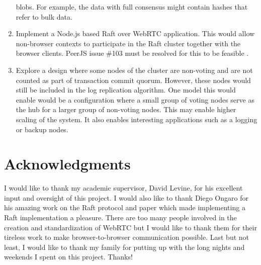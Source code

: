 \documentclass[conference,compsoc]{./IEEEtran/IEEEtran}
\begin{document}
\begin{enumerate}
    blobs. For example, the data with full consensus might contain
    hashes that refer to bulk data.
\item Implement a Node.js based Raft over WebRTC application. This
    would allow non-browser contexts to participate in the Raft
    cluster together with the browser clients. PeerJS issue \#103 must
    be resolved for this to be feasible \cite{peerjs:103}.
\item Explore a design where some nodes of the cluster are non-voting
    and are not counted as part of transaction commit quorum. However,
    these nodes would still be included in the log replication
    algorithm. One model this would enable would be a configuration
    where a small group of voting nodes serve as the hub for a larger
    group of non-voting nodes. This may enable higher scaling of the
    system. It also enables interesting applications such as a logging
    or backup nodes.
\end{enumerate}


\section*{Acknowledgments}
I would like to thank my academic supervisor, David Levine, for his
excellent input and oversight of this project. I would also like to
thank Diego Ongaro for his amazing work on the Raft protocol and paper which
made implementing a Raft implementation a pleasure.  There are too many people
involved in the creation and standardization of WebRTC but I would like to
thank them for their tireless work to make browser-to-browser communication
possible. Last but not least, I would like to thank my family for putting up
with the long nights and weekends I spent on this project. Thanks!




\end{document}
